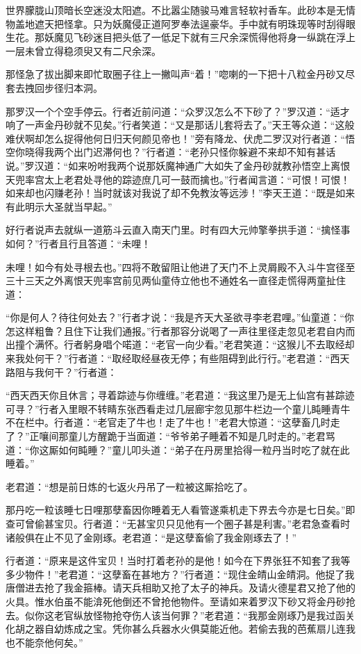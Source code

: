 \documentclass[12pt,UTF8]{ctexbook}
\begin{document}
世界朦胧山顶暗长空迷没太阳遮。不比嚣尘随骏马难言轻软衬香车。此砂本是无情物盖地遮天把怪拿。只为妖魔侵正道阿罗奉法逞豪华。手中就有明珠现等时刮得眼生花。那妖魔见飞砂迷目把头低了一低足下就有三尺余深慌得他将身一纵跳在浮上一层未曾立得稳须臾又有二尺余深。

那怪急了拔出脚来即忙取圈子往上一撇叫声“着！”唿喇的一下把十八粒金丹砂又尽套去拽回步径归本洞。

那罗汉一个个空手停云。行者近前问道：“众罗汉怎么不下砂了？”罗汉道：“适才响了一声金丹砂就不见矣。”行者笑道：“又是那话儿套将去了。”天王等众道：“这般难伏啊却怎么捉得他何日归天何颜见帝也！”旁有降龙、伏虎二罗汉对行者道：“悟空你晓得我两个出门迟滞何也？”行者道：“老孙只怪你躲避不来却不知有甚话说。”罗汉道：“如来吩咐我两个说那妖魔神通广大如失了金丹砂就教孙悟空上离恨天兜率宫太上老君处寻他的踪迹庶几可一鼓而擒也。”行者闻言道：“可恨！可恨！如来却也闪赚老孙！当时就该对我说了却不免教汝等远涉！”李天王道：“既是如来有此明示大圣就当早起。”

好行者说声去就纵一道筋斗云直入南天门里。时有四大元帅擎拳拱手道：“擒怪事如何？”行者且行且答道：“未哩！

未哩！如今有处寻根去也。”四将不敢留阻让他进了天门不上灵屑殿不入斗牛宫径至三十三天之外离恨天兜率宫前见两仙童侍立他也不通姓名一直径走慌得两童扯住道：

“你是何人？待往何处去？”行者才说：“我是齐天大圣欲寻李老君哩。”仙童道：“你怎这样粗鲁？且住下让我们通报。”行者那容分说喝了一声往里径走忽见老君自内而出撞个满怀。行者躬身唱个喏道：“老官一向少看。”老君笑道：“这猴儿不去取经却来我处何干？”行者道：“取经取经昼夜无停；有些阻碍到此行行。”老君道：“西天路阻与我何干？”行者道：

“西天西天你且休言；寻着踪迹与你缠缠。”老君道：“我这里乃是无上仙宫有甚踪迹可寻？”行者入里眼不转睛东张西看走过几层廊宇忽见那牛栏边一个童儿盹睡青牛不在栏中。行者道：“老官走了牛也！走了牛也！”老君大惊道：“这孽畜几时走了？”正嚷间那童儿方醒跪于当面道：“爷爷弟子睡着不知是几时走的。”老君骂道：“你这厮如何盹睡？”童儿叩头道：“弟子在丹房里拾得一粒丹当时吃了就在此睡着。”

老君道：“想是前日炼的七返火丹吊了一粒被这厮拾吃了。

那丹吃一粒该睡七日哩那孽畜因你睡着无人看管遂乘机走下界去今亦是七日矣。”即查可曾偷甚宝贝。行者道：“无甚宝贝只见他有一个圈子甚是利害。”老君急查看时诸般俱在止不见了金刚琢。老君道：“是这孽畜偷了我金刚琢去了！”

行者道：“原来是这件宝贝！当时打着老孙的是他！如今在下界张狂不知套了我等多少物件！”老君道：“这孽畜在甚地方？”行者道：“现住金皘山金皘洞。他捉了我唐僧进去抢了我金箍棒。请天兵相助又抢了太子的神兵。及请火德星君又抢了他的火具。惟水伯虽不能渰死他倒还不曾抢他物件。至请如来着罗汉下砂又将金丹砂抢去。似你这老官纵放怪物抢夺伤人该当何罪？”老君道：“我那金刚琢乃是我过函关化胡之器自幼炼成之宝。凭你甚么兵器水火俱莫能近他。若偷去我的芭蕉扇儿连我也不能奈他何矣。”
\end{document}
